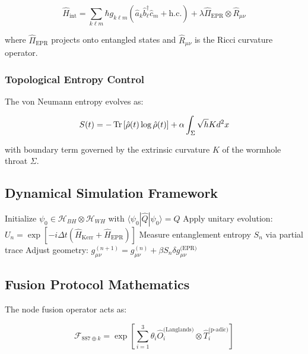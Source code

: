 \documentclass[12pt]{article}
\begin{document}
\begin{equation}
\hat{H}_{\text{int}} = \sum_{k\ell m}\hbar g_{k\ell m}\left(\hat{a}_k\hat{b}_\ell^\dagger\hat{c}_m + \text{h.c.}\right) + \lambda\hat{\Pi}_{\text{EPR}}\otimes\hat{R}_{\mu\nu}
\end{equation}

where $\hat{\Pi}_{\text{EPR}}$ projects onto entangled states and $\hat{R}_{\mu\nu}$ is the Ricci curvature operator.

\subsubsection{Topological Entropy Control}
The von Neumann entropy evolves as:

\begin{equation}
S(t) = -\Tr\left[\hat{\rho}(t)\log\hat{\rho}(t)\right] + \alpha\int_\Sigma \sqrt{h}K d^2x
\end{equation}

with boundary term governed by the extrinsic curvature $K$ of the wormhole throat $\Sigma$.

\subsection{Dynamical Simulation Framework}

\begin{algorithm}[H]
\caption{Kerr-Newman-Wormhole Hybrid Dynamics}
\begin{algorithmic}[1]
\STATE Initialize $\psi_0 \in \mathcal{H}_{BH}\otimes\mathcal{H}_{WH}$ with $\langle \psi_0|\hat{Q}|\psi_0\rangle = Q$
\STATE Apply unitary evolution: $U_n = \exp\left[-i\Delta t(\hat{H}_{\text{Kerr}} + \hat{H}_{\text{EPR}})\right]$
\STATE Measure entanglement entropy $S_n$ via partial trace
\STATE Adjust geometry: $g_{\mu\nu}^{(n+1)} = g_{\mu\nu}^{(n)} + \beta S_n \delta g_{\mu\nu}^{\text{(EPR)}}$
\ENDFOR
\end{algorithmic}
\end{algorithm}

\subsection{Fusion Protocol Mathematics}
The node fusion operator acts as:

\begin{equation}
\mathcal{F}_{887\oplus k} = \exp\left[\sum_{i=1}^3 \theta_i \hat{O}_i^{\text{(Langlands)}}\otimes \hat{T}_i^{\text{(p-adic)}}\right]
\end{equation}
\end{document}
